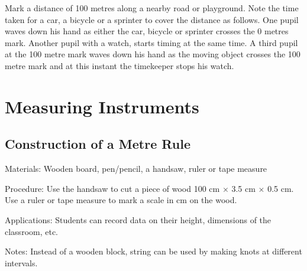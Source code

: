 \begin{multicols}{2}
Mark a distance of 100 metres along a nearby road or playground. Note the time taken for a
car, a bicycle or a sprinter to cover the distance as follows. One pupil waves down his hand
as either the car, bicycle or sprinter crosses the 0 metres mark. Another pupil with a watch,
starts timing at the same time. A third pupil at the 100 metre mark waves down his hand as
the moving object crosses the 100 metre mark and at this instant the timekeeper stops his
watch.

\vfill
\columnbreak



\section*{Measuring Instruments}


\subsection{Construction of a Metre Rule} 
\label{sub:metrerule}

\begin{description*}
\item[Materials:]{Wooden board, pen\slash pencil, a handsaw, ruler or tape measure}
\item[Procedure:]{Use the handsaw to cut a piece of wood 100 cm $\times$ 3.5 cm $\times$ 0.5 cm. Use a ruler or tape measure to mark a scale in cm on the wood.}
\item[Applications:]{Students can record data on their height, dimensions of the classroom, etc.}
\item[Notes:]{Instead of a wooden block, string can be used by making knots at different intervals.}
\end{description*}


\end{multicols}
